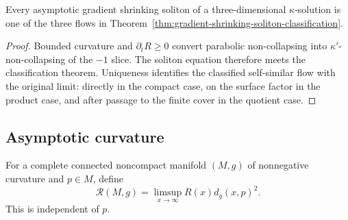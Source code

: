 \begin{corollary}\label{cor:asymptotic-soliton-classification-application}
Every asymptotic gradient shrinking soliton of a three-dimensional
$\kappa$-solution is one of the three flows in
Theorem~\ref{thm:gradient-shrinking-soliton-classification}.
\end{corollary}
\begin{proof}
\sketch
{}
Bounded curvature and $\partial_tR\geq0$ convert parabolic
non-collapsing into $\kappa'$-non-collapsing of the $-1$ slice.
The soliton equation therefore meets the classification theorem.
Uniqueness identifies the classified self-similar flow with the
original limit: directly in the compact case, on the surface factor
in the product case, and after passage to the finite cover in the
quotient case.
\end{proof}

\subsection{Asymptotic curvature}

\begin{definition}\label{def:asymptotic-scalar-curvature}
For a complete connected noncompact manifold $(M,g)$ of
nonnegative curvature and $p\in M$, define
\[
 \mathcal R(M,g)=\limsup_{x\to\infty}R(x)d_g(x,p)^2.
\]
This is independent of $p$.
\end{definition}

